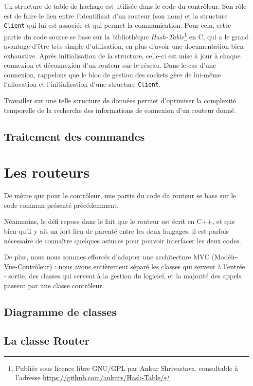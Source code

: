 \documentclass[a4paper,11pt]{article}
\begin{document}
Un structure de table de hachage est utilisée dans le code du contrôleur. Son rôle est de faire le lien entre l'identifiant d'un routeur (son nom) et la structure \texttt{Client} qui lui est associée et qui permet la communication. Pour cela, cette partie du code source se base sur la bibliothèque \textit{Hash-Table}\footnote{Publiée sous licence libre GNU/GPL par Ankur Shrivastava, consultable à l'adresse \url{https://github.com/ankurs/Hash-Table/}} en C, qui a le grand avantage d'être très simple d'utilisation, en plus d'avoir une documentation bien exhaustive. Après initialisation de la structure, celle-ci est mise à jour à chaque connexion et déconnexion d'un routeur sur le réseau. Dans le cas d'une connexion, rappelons que le bloc de gestion des sockets gère de lui-même l'allocation et l'initialisation d'une structure \texttt{Client}.

Travailler sur une telle structure de données permet d'optimiser la complexité temporelle de la recherche des informations de connexion d'un routeur donné.

\subsection{Traitement des commandes}

\section{Les routeurs}

De même que pour le contrôleur, une partie du code du routeur se base sur le code commun présenté précédemment.

Néanmoins, le défi repose dans le fait que le routeur est écrit en C++, et que bien qu'il y ait un fort lien de parenté
entre les deux langages, il est parfois nécessaire de connaître quelques astuces pour pouvoir interfacer les deux codes.

De plus, nous nous sommes efforcés d'adopter une architecture MVC (Modèle-Vue-Contrôleur) : nous avons entièrement séparé les classes qui servent
à l'entrée - sortie, des classes qui servent à la gestion du logiciel, et la majorité des appels passent par une classe contrôleur.

\subsection{Diagramme de classes}

\subsection{La classe Router}
\end{document}
